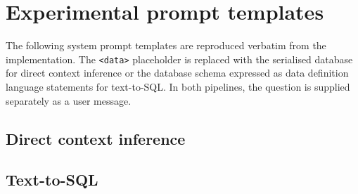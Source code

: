 \appendix

\chapter{Experimental prompt templates} \label{app:prompts}

The following system prompt templates are reproduced verbatim from the implementation. The \texttt{<data>}
placeholder is replaced with the serialised database for direct context inference or the database schema
expressed as data definition language statements for text-to-SQL. In both pipelines, the question is supplied
separately as a user message.

\section{Direct context inference} \label{app:direct-prompt}



\section{Text-to-SQL} \label{app:sql-prompt}


